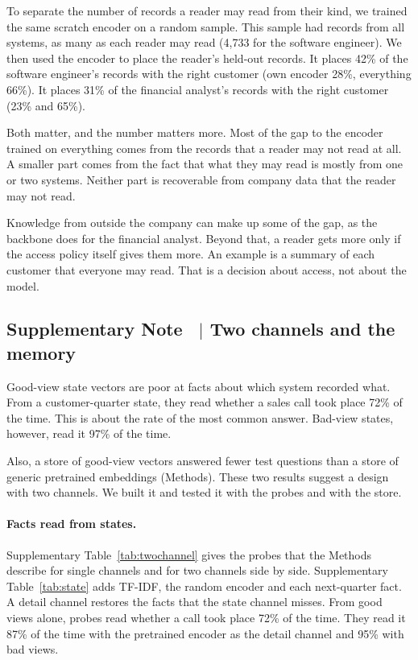\documentclass[11pt]{article}
\newcounter{suppnote}
\newcommand{\suppnote}[2]{\refstepcounter{suppnote}\label{#2}\subsection{Supplementary Note \thesuppnote\ $|$ #1}}
\begin{document}
To separate the number of records a reader may read from their kind, we trained the same scratch encoder on a random sample. This sample had records from all systems, as many as each reader may read (4{,}733 for the software engineer). We then used the encoder to place the reader's held-out records. It places 42\% of the software engineer's records with the right customer (own encoder 28\%, everything 66\%). It places 31\% of the financial analyst's records with the right customer (23\% and 65\%).

Both matter, and the number matters more. Most of the gap to the encoder trained on everything comes from the records that a reader may not read at all. A smaller part comes from the fact that what they may read is mostly from one or two systems. Neither part is recoverable from company data that the reader may not read.

Knowledge from outside the company can make up some of the gap, as the backbone does for the financial analyst. Beyond that, a reader gets more only if the access policy itself gives them more. An example is a summary of each customer that everyone may read. That is a decision about access, not about the model.

\suppnote{Two channels and the memory}{sec:twochannel}
Good-view state vectors are poor at facts about which system recorded what. From a customer-quarter state, they read whether a sales call took place 72\% of the time. This is about the rate of the most common answer. Bad-view states, however, read it 97\% of the time.

Also, a store of good-view vectors answered fewer test questions than a store of generic pretrained embeddings (Methods). These two results suggest a design with two channels. We built it and tested it with the probes and with the store.

\paragraph{Facts read from states.} Supplementary Table~\ref{tab:twochannel} gives the probes that the Methods describe for single channels and for two channels side by side. Supplementary Table~\ref{tab:state} adds TF-IDF, the random encoder and each next-quarter fact. A detail channel restores the facts that the state channel misses. From good views alone, probes read whether a call took place 72\% of the time. They read it 87\% of the time with the pretrained encoder as the detail channel and 95\% with bad views.
\end{document}
